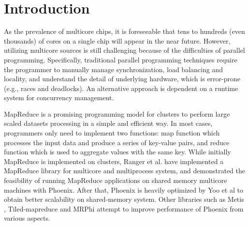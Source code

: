 \section{Introduction}
\label{sec:intro}



As the prevalence of multicore chips, it is foreseeable that tens to hundreds (even thousands) of cores on a single chip will appear in the near future\cite{Borkar2007core}.
However, utilizing multicore sources is still challenging because of the difficulties of parallel programming.
Specifically, traditional parallel programming techniques require the programmer to manually manage synchronization, load balancing and locality, and understand the detail  of underlying hardware, which is error-prone (e.g., races and deadlocks). %
An alternative approach is dependent on a runtime system for concurrency management. 

MapReduce\cite{dean2004mapreduce} is a promising programming model for clusters to perform large scaled datasets processing in a simple and efficient way.
In most cases, programmers only need to implement two functions: 
map function which processes the input data and produce  a series of key-value pairs, and reduce function which is used to aggregate values with the same key.
While initially MapReduce is implemented on clusters, Ranger et al. have implemented a MapReduce library for multicore and multiprocess system, and demonstrated the feasibility of running MapReduce applications on shared memory multicore machines with Phoenix\cite{ranger2007phoenix}.
After that, Phoenix is heavily optimized by Yoo et al\cite{yoo2009phoenix2} to obtain better scalability on shared-memory system.
Other libraries such as Metis\cite{mao2010metis} , Tiled-mapreduce\cite{chen2010tiled} and MRPhi\cite{lu2013mrphi} attempt to improve performance of Phoenix from various aspects.


